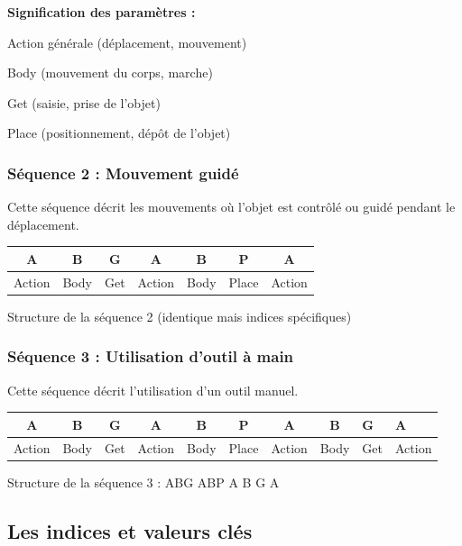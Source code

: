 \documentclass[a4paper,12pt]{article}
\begin{document}
\textbf{Signification des paramètres :}
\begin{description}[labelwidth=0.8cm]
    \item[A] Action générale (déplacement, mouvement)
    \item[B] Body (mouvement du corps, marche)
    \item[G] Get (saisie, prise de l'objet)
    \item[P] Place (positionnement, dépôt de l'objet)
\end{description}

\subsubsection{Séquence 2 : Mouvement guidé}

Cette séquence décrit les mouvements où l'objet est contrôlé ou guidé pendant le déplacement.

\begin{center}
\begin{tabular}{|c|c|c|c|c|c|c|}
\hline
\textbf{A} & \textbf{B} & \textbf{G} & \textbf{A} & \textbf{B} & \textbf{P} & \textbf{A} \\
\hline
Action & Body & Get & Action & Body & Place & Action \\
\hline
\end{tabular}
\caption*{Structure de la séquence 2 (identique mais indices spécifiques)}
\end{center}

\subsubsection{Séquence 3 : Utilisation d'outil à main}

Cette séquence décrit l'utilisation d'un outil manuel.

\begin{center}
\begin{tabular}{|c|c|c|c|c|c|c|c|}
\hline
\textbf{A} & \textbf{B} & \textbf{G} & \textbf{A} & \textbf{B} & \textbf{P} & \textbf{A} & \textbf{B} & \textbf{G} & \textbf{A} \\
\hline
Action & Body & Get & Action & Body & Place & Action & Body & Get & Action \\
\hline
\end{tabular}
\caption*{Structure de la séquence 3 : ABG ABP A B G A}
\end{center}

\subsection{Les indices et valeurs clés}
\end{document}
